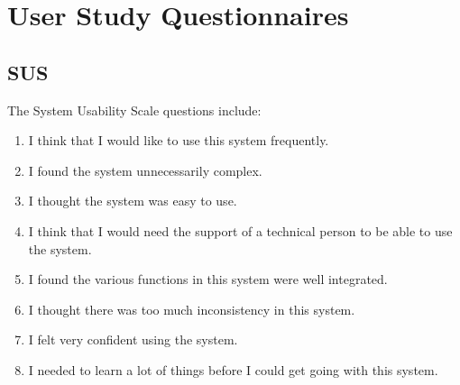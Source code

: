 \documentclass[12pt, title page, manuscript, nonacm]{acmart}
\begin{document}
\section*{User Study Questionnaires}
\subsection*{SUS}
The System Usability Scale questions include:
\begin{enumerate}
    \item I think that I would like to use this system frequently.
    \item I found the system unnecessarily complex.
    \item I thought the system was easy to use.
    \item I think that I would need the support of a technical person to be able to use the system.
    \item I found the various functions in this system were well integrated.
    \item I thought there was too much inconsistency in this system.
    \item I felt very confident using the system.
    \item I needed to learn a lot of things before I could get going with this system.
\end{enumerate}
\end{document}
